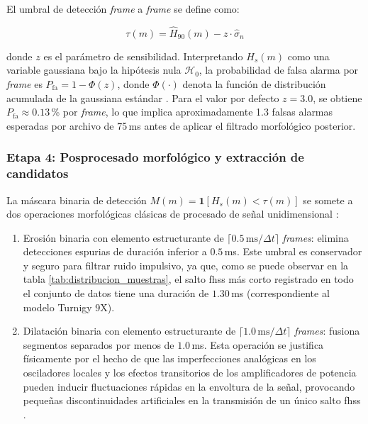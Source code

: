 \vspace{\baselineskip}

El umbral de detección \textit{frame} a \textit{frame} se define como:

\begin{equation}
    \tau(m) = \widehat{H}_{90}(m) - z \cdot \hat{\sigma}_n
    \label{eq:umbral_cfar}
\end{equation}

donde $z$ es el parámetro de sensibilidad. Interpretando $H_s(m)$ como una variable gaussiana bajo la hipótesis nula $\mathcal{H}_0$, la probabilidad de falsa alarma por \textit{frame} es $P_{\text{fa}} = 1 - \Phi(z)$, donde $\Phi(\cdot)$ denota la función de distribución acumulada de la gaussiana estándar \cite{kay_fundamentals_1998}. Para el valor por defecto $z = 3.0$, se obtiene $P_{\text{fa}} \approx 0.13$\,\% por \textit{frame}, lo que implica aproximadamente 1.3 falsas alarmas esperadas por archivo de 75\,ms antes de aplicar el filtrado morfológico posterior.

\subsubsection{Etapa 4: Posprocesado morfológico y extracción de candidatos}

La máscara binaria de detección $M(m) = \mathbf{1}[H_s(m) < \tau(m)]$ se somete a dos operaciones morfológicas clásicas de procesado de señal unidimensional \cite{olesinski_radio_2023}:

\begin{enumerate}\itemsep 0em
    \item Erosión binaria con elemento estructurante de $\lceil 0.5\,\text{ms}/\Delta t \rceil$ \textit{frames}: elimina detecciones espurias de duración inferior a $0.5$\,ms. Este umbral es conservador y seguro para filtrar ruido impulsivo, ya que, como se puede observar en la tabla \ref{tab:distribucion_muestras}, el salto \gls{fhss} más corto registrado en todo el conjunto de datos tiene una duración de $1.30$\,ms (correspondiente al modelo Turnigy 9X).

    \item Dilatación binaria con elemento estructurante de $\lceil 1.0\,\text{ms}/\Delta t \rceil$ \textit{frames}: fusiona segmentos separados por menos de $1.0$\,ms. Esta operación se justifica físicamente por el hecho de que las imperfecciones analógicas en los osciladores locales y los efectos transitorios de los amplificadores de potencia pueden inducir fluctuaciones rápidas en la envoltura de la señal, provocando pequeñas discontinuidades artificiales en la transmisión de un único salto \gls{fhss} \cite{ezuma_micro-uav_2019, ezuma_detection_2020}.
\end{enumerate}

